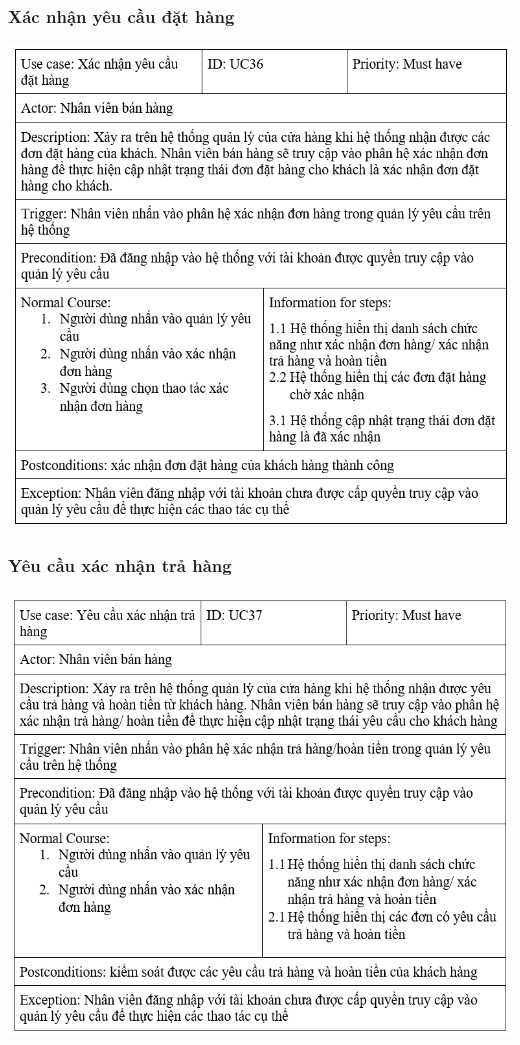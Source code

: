 \documentclass[12pt,a4paper,2sides]{report}
\begin{document}
\subsubsection{Xác nhận yêu cầu đặt hàng}
    \includegraphics[width=1\linewidth]{lib/usecase/xacnhanyeucaudh.png}\\\vspace*{1cm} 
\subsubsection{Yêu cầu xác nhận trả hàng}
    \includegraphics[width=1\linewidth]{lib/usecase/yeucauxacnhantrahang.png}\\\vspace*{1cm} 
\end{document}
